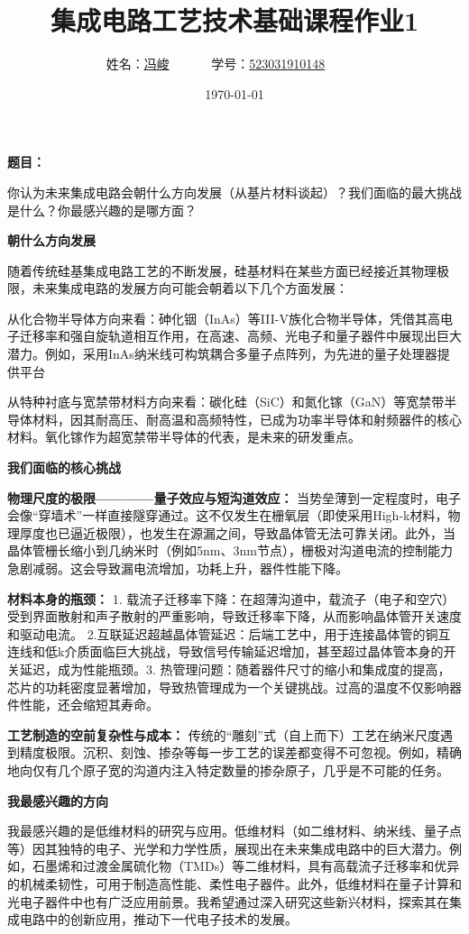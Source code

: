 \documentclass[UTF8,12pt,a4paper]{ctexart}
\title{集成电路工艺技术基础课程作业1}
\author{
	姓名：\underline{冯峻}~~~~~~
	学号：\underline{523031910148}~~~~~~}
\date{\today}
\begin{document}
\fancyfoot[C]{\thepage}

\maketitle

\textbf{题目：} 

你认为未来集成电路会朝什么方向发展（从基片材料谈起）？我们面临的最大挑战是什么？你最感兴趣的是哪方面？

\textbf{朝什么方向发展}

随着传统硅基集成电路工艺的不断发展，硅基材料在某些方面已经接近其物理极限，未来集成电路的发展方向可能会朝着以下几个方面发展：

从化合物半导体方向来看：砷化铟（InAs）等III-V族化合物半导体，凭借其高电子迁移率和强自旋轨道相互作用，在高速、高频、光电子和量子器件中展现出巨大潜力。例如，采用InAs纳米线可构筑耦合多量子点阵列，为先进的量子处理器提供平台

从特种衬底与宽禁带材料方向来看：碳化硅（SiC）和氮化镓（GaN）等宽禁带半导体材料，因其耐高压、耐高温和高频特性，已成为功率半导体和射频器件的核心材料。氧化镓作为超宽禁带半导体的代表，是未来的研发重点。

\textbf{我们面临的核心挑战}

\textbf{物理尺度的极限————量子效应与短沟道效应：} 当势垒薄到一定程度时，电子会像“穿墙术”一样直接隧穿通过。这不仅发生在栅氧层（即使采用High-k材料，物理厚度也已逼近极限），也发生在源漏之间，导致晶体管无法可靠关闭。此外，当晶体管栅长缩小到几纳米时（例如5nm、3nm节点），栅极对沟道电流的控制能力急剧减弱。这会导致漏电流增加，功耗上升，器件性能下降。

\textbf{材料本身的瓶颈：} 1. 载流子迁移率下降：在超薄沟道中，载流子（电子和空穴）受到界面散射和声子散射的严重影响，导致迁移率下降，从而影响晶体管开关速度和驱动电流。 2.互联延迟超越晶体管延迟：后端工艺中，用于连接晶体管的铜互连线和低k介质面临巨大挑战，导致信号传输延迟增加，甚至超过晶体管本身的开关延迟，成为性能瓶颈。3. 热管理问题：随着器件尺寸的缩小和集成度的提高，芯片的功耗密度显著增加，导致热管理成为一个关键挑战。过高的温度不仅影响器件性能，还会缩短其寿命。

\textbf{工艺制造的空前复杂性与成本：} 传统的“雕刻”式（自上而下）工艺在纳米尺度遇到精度极限。沉积、刻蚀、掺杂等每一步工艺的误差都变得不可忽视。例如，精确地向仅有几个原子宽的沟道内注入特定数量的掺杂原子，几乎是不可能的任务。

\textbf{我最感兴趣的方向}

我最感兴趣的是低维材料的研究与应用。低维材料（如二维材料、纳米线、量子点等）因其独特的电子、光学和力学性质，展现出在未来集成电路中的巨大潜力。例如，石墨烯和过渡金属硫化物（TMDs）等二维材料，具有高载流子迁移率和优异的机械柔韧性，可用于制造高性能、柔性电子器件。此外，低维材料在量子计算和光电子器件中也有广泛应用前景。我希望通过深入研究这些新兴材料，探索其在集成电路中的创新应用，推动下一代电子技术的发展。
\end{document}
